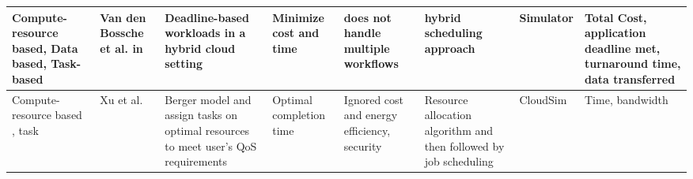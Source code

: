 \begin{table*}[!htbp]
{\begin{tabular}{|g{2cm} p{1.9cm} p{2cm} p{2cm} p{2cm} p{2cm} p{2cm} p{2cm}|}
 Compute-resource based, Data based, Task-based & Van den Bossche et al. in~\cite{vandenbosshe2013} & Deadline-based workloads in a hybrid cloud setting & Minimize cost and time & does not handle multiple workflows & hybrid scheduling approach & Simulator & Total Cost, application deadline met, turnaround time, data transferred 
\\ \hline

Compute-resource based , task & Xu et al.~\cite{xu2011job} & Berger model and assign tasks on optimal resources to meet user's QoS requirements & Optimal completion time & Ignored cost and energy efficiency, security& Resource allocation algorithm and then followed by job scheduling & CloudSim & Time, bandwidth 
\\ \hline


\end{tabular}
}
\end{table*}
